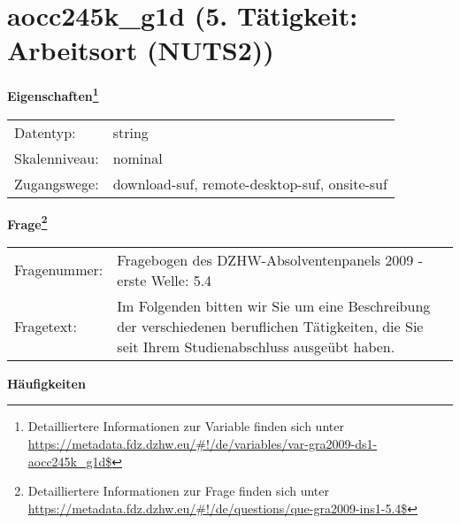 
    \setcounter{footnote}{0}

    \vspace*{-1.8cm}
	\section{aocc245k\_g1d (5. Tätigkeit: Arbeitsort (NUTS2))}
	\label{section:aocc245k_g1d}



    \vspace*{0.5cm}
    \noindent\textbf{Eigenschaften\footnote{Detailliertere Informationen zur Variable finden sich unter
		\url{https://metadata.fdz.dzhw.eu/\#!/de/variables/var-gra2009-ds1-aocc245k_g1d$}}}\\
	\begin{tabularx}{\hsize}{@{}lX}
	Datentyp: & string \\
	Skalenniveau: & nominal \\
	Zugangswege: &
	  download-suf, 
	  remote-desktop-suf, 
	  onsite-suf
 \\
    \end{tabularx}



				\vspace*{0.5cm}
                \noindent\textbf{Frage\footnote{Detailliertere Informationen zur Frage finden sich unter
		              \url{https://metadata.fdz.dzhw.eu/\#!/de/questions/que-gra2009-ins1-5.4$}}}\\
				\begin{tabularx}{\hsize}{@{}lX}
					Fragenummer: &
					  Fragebogen des DZHW-Absolventenpanels 2009 - erste Welle:
					  5.4
 \\
					Fragetext: & Im Folgenden bitten wir Sie um eine Beschreibung der verschiedenen beruflichen Tätigkeiten, die Sie seit Ihrem Studienabschluss ausgeübt haben. \\
				\end{tabularx}





        		\vspace*{0.5cm}
                \noindent\textbf{Häufigkeiten}

